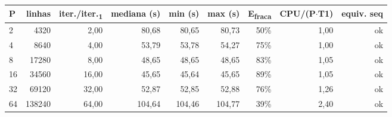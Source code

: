 \begin{tabular}{lrrrrrrrr}
\toprule
P & linhas & iter./iter.\textsubscript{1} & mediana (s) & min (s) & max (s) & E\textsubscript{fraca} & CPU/(P$\cdot$T1) & equiv. seq \\
\midrule
2 & 4320 & 2,00 & 80,68 & 80,65 & 80,73 & 50\% & 1,00 & ok \\
4 & 8640 & 4,00 & 53,79 & 53,78 & 54,27 & 75\% & 1,00 & ok \\
8 & 17280 & 8,00 & 48,65 & 48,65 & 48,65 & 83\% & 1,05 & ok \\
16 & 34560 & 16,00 & 45,65 & 45,64 & 45,65 & 89\% & 1,05 & ok \\
32 & 69120 & 32,00 & 52,87 & 52,85 & 52,88 & 76\% & 1,26 & ok \\
64 & 138240 & 64,00 & 104,64 & 104,46 & 104,77 & 39\% & 2,40 & ok \\
\bottomrule
\end{tabular}
